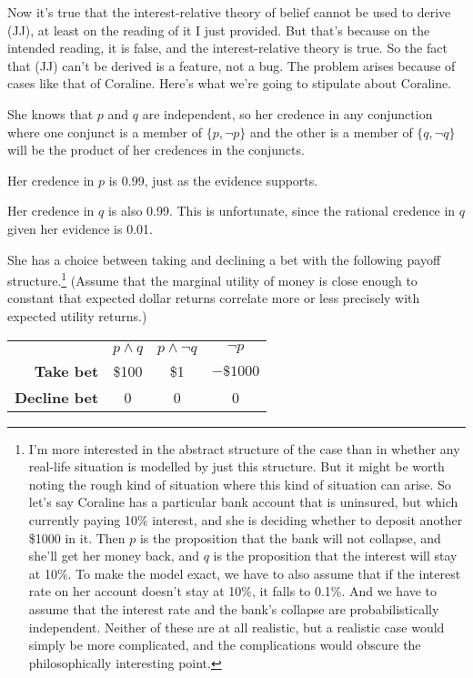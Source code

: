 Now it's true that the interest-relative theory of belief cannot be used to derive (JJ), at least on the reading of it I just provided. But that's because on the intended reading, it is false, and the interest-relative theory is true. So the fact that (JJ) can't be derived is a feature, not a bug. The problem arises because of cases like that of Coraline. Here's what we're going to stipulate about Coraline.

\begin{itemize*}
\item She knows that \(p\) and \(q\) are independent, so her credence in any conjunction where one conjunct is a member of  \(\{p,  \neg p\}\) and the other is a member of \(\{q, \neg q\}\) will be the product of her credences in the conjuncts.
\item Her credence in \(p\) is 0.99, just as the evidence supports.
\item Her credence in \(q\) is also 0.99. This is unfortunate, since the rational credence in \(q\) given her evidence is 0.01.
\item She has a choice between taking and declining a bet with the following payoff structure.\footnote{I'm more interested in the abstract structure of the case than in whether any real-life situation is modelled by just this structure. But it might be worth noting the rough kind of situation where this kind of situation can arise. So let's say Coraline has a particular bank account that is uninsured, but which currently paying 10\% interest, and she is deciding whether to deposit another \$1000 in it. Then \(p\) is the proposition that the bank will not collapse, and she'll get her money back, and \(q\) is the proposition that the interest will stay at 10\%. To make the model exact, we have to also assume that if the interest rate on her account doesn't stay at 10\%, it falls to 0.1\%. And we have to assume that the interest rate and the bank's collapse are probabilistically independent. Neither of these are at all realistic, but a realistic case would simply be more complicated, and the complications would obscure the philosophically interesting point.} (Assume that the marginal utility of money is close enough to constant that expected dollar returns correlate more or less precisely with expected utility returns.)
\end{itemize*}

\begin{center}
\begin{tabular}{r c c c}
 & \textbf{\(p \wedge q\)} & \textbf{\(p \wedge \neg q\)} & \textbf{\(\neg p\)} \\
\textbf{Take bet} & \$100 & \$1 & \(-\$1000\) \\
\textbf{Decline bet} & 0 & 0 & 0 \\
\end{tabular}
\end{center}

